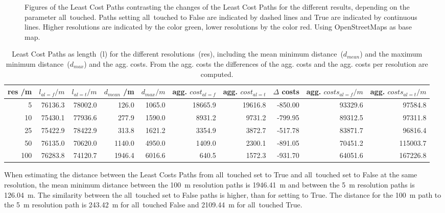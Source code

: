 \begin{figure}
	\centering

	\qquad

	\caption{Figures of the Least Cost Paths contrasting the changes of the Least Cost Paths for the different results, depending on the parameter all~touched. Paths setting all~touched to False are indicated by dashed lines and True are indicated by continuous lines. Higher resolutions are indicated by the color green, lower resolutions by the color red. Using OpenStreetMaps as base map.}
	\label{fig:paths_alltouched}
\end{figure}

\begin{table*}[t]
	\caption{Least Cost Paths as length~(l) for the different resolutions~(res), including the mean minimum distance~($d_{mean}$) and the maximum minimum distance~($d_{max}$) and the agg. costs. From the agg. costs the differences of the agg. costs and the agg. costs per resolution are computed.} 
	\label{tab:2}
	\centering
	\begin{tabular}{ r  r  r  r  r  r  r  r  r  r}
		res /m & $l_{al=f} /m$ & $l_{al=t} /m$ & $d_{mean}$ /m & $d_{max}/m$ & agg.  $ cost_{al=f}$ & agg. $ cost_{al=t}$ &  $\Delta $ costs & agg. $costs_{al=f} /m$ & agg. $costs_{al=t} /m$ \\
		\hline
		5 	& 76136.3	& 78002.0 &  126.0 & 1065.0 & 18665.9 & 19616.8 & -850.00 & 93329.6 &  97584.8 \\
		10 	& 75430.1 	& 77936.6 &  277.9 & 1590.0 &  8931.2 &  9731.2 & -799.95 & 89312.5 &  97311.8 \\
		25 	& 75422.9 	& 78422.9 &  313.8 & 1621.2 &  3354.9 &  3872.7 & -517.78 & 83871.7 &  96816.4 \\
		50 	& 76135.0	& 70620.0 & 1140.0 & 4950.0 &  1409.0 &  2300.1 & -891.05 & 70451.2 & 115003.7 \\
		100 & 76283.8	& 74120.7 & 1946.4 & 6016.6 &   640.5 &  1572.3 & -931.70 & 64051.6 & 167226.8 \\

	\end{tabular}
\end{table*}

When estimating the distance between the Least Costs Paths from all~touched set to True and all~touched set to False at the same resolution, 
the mean minimum distance between the 100~m resolution paths is 1946.41~m and between the 5~m resolution paths is 126.04~m.
The similarity between the all~touched set to False paths is higher, than for setting to True.
The distance for the 100~m path to the 5~m resolution path is 243.42~m for all~touched False and 2109.44~m for all~touched True.

